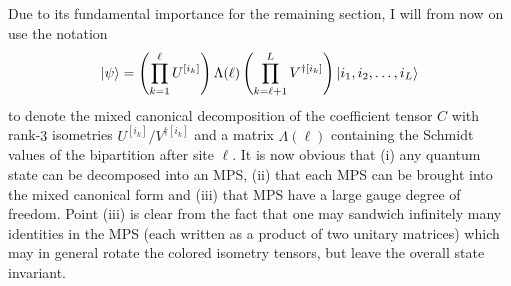 Due to its fundamental importance for the remaining section, I will from now on use the notation
\begin{align}
    \ket\psi = \left( \prod_{k=1}^\ell U^{[i_k]} \right)\Lambda(\ell)\left( \prod_{k=\ell+1}^L V^{\dag[i_k]} \right)\ket{i_1,i_2,\dots,i_L}
\end{align}
to denote the mixed canonical decomposition of the coefficient tensor $C$ with rank-$3$ isometries ${U^{[i_k]}/V^{\dag[i_k]}}$ and a matrix $\Lambda(\ell)$ containing the Schmidt values of the bipartition after site $\ell$.
It is now obvious that (i) any quantum state can be decomposed into an MPS, (ii) that each MPS can be brought into the mixed canonical form and (iii) that MPS have a large gauge degree of freedom.
Point (iii) is clear from the fact that one may sandwich infinitely many identities in the MPS (each written as a product of two unitary matrices) which may in general rotate the colored isometry tensors, but leave the overall state invariant.
%
%
